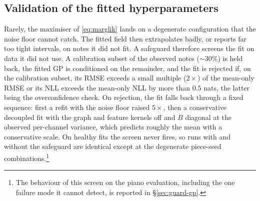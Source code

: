\subsection{Validation of the fitted hyperparameters}
Rarely, the maximiser of \eqref{eq:marglik} lands on a degenerate
configuration that the noise floor cannot catch. The fitted field then
extrapolates badly, or reports far too tight intervals, on notes it did not
fit. A safeguard therefore screens the fit on data it did not use. A
calibration subset of the observed notes ($\sim$30\%) is held back, the
fitted GP is conditioned on the remainder, and the fit is rejected if, on
the calibration subset, its RMSE exceeds a small multiple ($2\times$) of the
mean-only RMSE or its NLL exceeds the mean-only NLL by more than $0.5$ nats,
the latter being the overconfidence check. On rejection, the fit falls back
through a fixed sequence: first a refit with the noise floor raised
$5\times$, then a conservative decoupled fit with the graph and feature
kernels off and $B$ diagonal at the observed per-channel variance, which
predicts roughly the mean with a conservative scale. On healthy fits the
screen never fires, so runs with and without the safeguard are identical
except at the degenerate piece-seed combinations.\footnote{The behaviour of
this screen on the piano evaluation, including the one failure mode it
cannot detect, is reported in \S\ref{sec:guard-gp}.}

